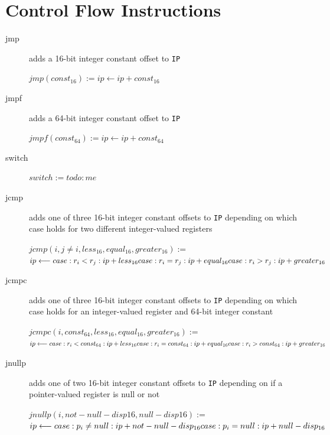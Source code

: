 \documentclass[english,a4paper]{report}
\begin{document}
\section{Control Flow Instructions}
\begin{description}
	\item[jmp] adds a 16-bit integer constant offset to \verb|IP|
	
	$jmp(const_{16}) := ip \longleftarrow ip + const_{16}$ \\
	\item[jmpf] adds a 64-bit integer constant offset to \verb|IP|
	
	$jmpf(const_{64}) := ip \longleftarrow ip + const_{64}$ \\
	\item[switch]
	
	$switch := todo: me$ \\
	\item[jcmp] adds one of three 16-bit integer constant offsets to
	\verb|IP| depending on which case holds for two different
	integer-valued registers
	
	$jcmp(i, j\neq i,less_{16},equal_{16},greater_{16}) :=$ \\
	$ ip \longleftarrow  \\
	case :r_{i} < r_{j}: ip + less_{16}   \\
	case :r_{i} = r_{j}: ip + equal_{16} \\
	case :r_{i} > r_{j}: ip + greater_{16}$ \\
	\item[jcmpc] adds one of three 16-bit integer constant offsets to
	\verb|IP| depending on which case holds for an integer-valued
	register and 64-bit integer constant
	
	$jcmpc (i, const_{64},less_{16},equal_{16},greater_{16}) :=$ \\
	$ ip \longleftarrow  \\
	case: r_{i} < const_{64}: ip + less_{16}   \\
	case: r_{i} = const_{64}: ip + equal_{16} \\
	case: r_{i} > const_{64}: ip + greater_{16}$
	\item[jnullp] adds one of two 16-bit integer constant offsets to
	\verb|IP| depending on if a pointer-valued register is null or not
	
	$jnullp(i,not-null-disp16,null-disp16) :=$ \\
	$ip \longleftarrow \\
	case: p_{i} \neq null: ip + not-null-disp_{16} \\
	case: p_{i} = null: ip + null-disp_{16}$ \\
\end{description}
\end{document}
